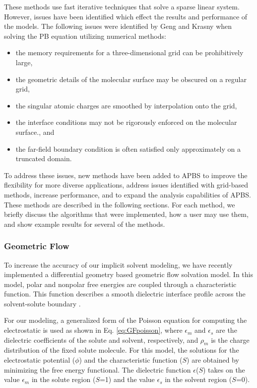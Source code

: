 \documentclass[11pt,titlepage]{article}
\begin{document}
These methods use fast iterative techniques that solve a sparse linear system. However, issues have been identified which effect the results and performance of the models. The following issues were identified by Geng and Krasny \cite{geng2013} when solving the PB equation utilizing numerical methods:
%
\begin{itemize}
	\itemsep-0.25em
	\item the memory requirements for a three-dimensional grid can be prohibitively large,
	\item the geometric details of the molecular surface may be obscured on a regular grid,
	\item the singular atomic charges are smoothed by interpolation onto the grid,
	\item the interface conditions may not be rigorously enforced on the molecular surface., and
	\item the far-field boundary condition is often satisfied only approximately on a truncated domain.
\end{itemize}
%
To address these issues, new methods have been added to APBS to improve the flexibility for more diverse applications, address issues identified with grid-based methods, increase performance, and to expand the analysis capabilities of APBS. These methods are described in the following sections. For each method, we briefly discuss the algorithms that were implemented, how a user may use them, and show example results for several of the methods.





\subsubsection{Geometric Flow}
To increase the accuracy of our implicit solvent modeling, we have recently implemented a differential geometry based geometric flow solvation model. In this model, polar and nonpolar free energies are coupled through a characteristic function. This function describes a smooth dielectric interface profile across the solvent-solute boundary \cite{thomas2013}. 

For our modeling, a generalized form of the Poisson equation for computing the electrostatic is used as shown in Eq. \ref{eq:GFpoisson}, where $\epsilon_m$ and $\epsilon_s$ are the dielectric coefficients of the solute and solvent, respectively, and $\rho_m$ is the charge distribution of the fixed solute molecule. For this model, the solutions for the electrostatic potential ($\phi$) and the characteristic function ($S$) are obtained by minimizing the free energy functional. The dielectric function $\epsilon$($S$) takes on the value $\epsilon_m$ in the solute region ($S$=1) and the value $\epsilon_s$ in the solvent region ($S$=0).
\end{document}
